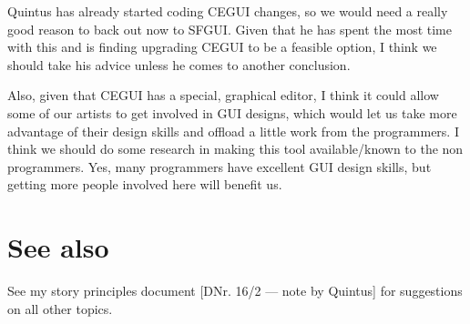 \documentclass{gd-document}
\begin{document}
Quintus has already started coding CEGUI changes, so we would need a really good reason to back out now to SFGUI.
Given that he has spent the most time with this and is finding upgrading CEGUI to be a feasible option, I think we should
take his advice unless he comes to another conclusion.

Also, given that CEGUI has a special, graphical editor, I think it could allow some of our artists to get involved in GUI
designs, which would let us take more advantage of their design skills and offload a little work from the programmers.
I think we should do some research in making this tool available/known to the non programmers.  Yes, many programmers
have excellent GUI design skills, but getting more people involved here will benefit us.

\section{See also}

See my story principles document [DNr. 16/2 — note by Quintus] for
suggestions on all other topics.
\end{document}
